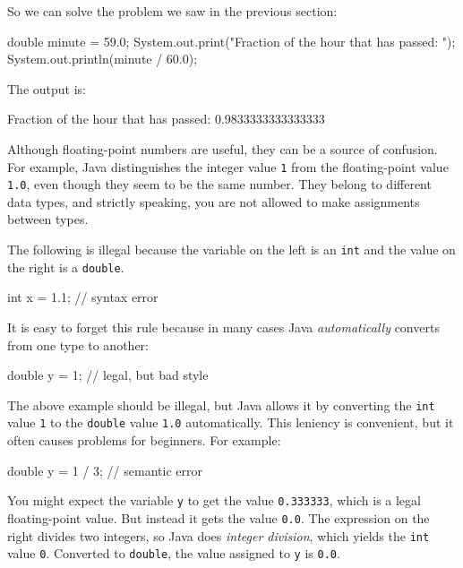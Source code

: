 \documentclass[12pt]{book}
\theoremstyle{exercise}
\newcommand{\java}[1]{\verb"#1"}
\newcommand{\java}[1]{\lstinline{#1}} %
\begin{document}
So we can solve the problem we saw in the previous section:

\begin{code}
    double minute = 59.0;
    System.out.print("Fraction of the hour that has passed: ");
    System.out.println(minute / 60.0);
\end{code}

The output is:

\begin{stdout}
Fraction of the hour that has passed: 0.9833333333333333
\end{stdout}

Although floating-point numbers are useful, they can be a source of confusion.
For example, Java distinguishes the integer value \java{1} from the floating-point value \java{1.0}, even though they seem to be the same number.
They belong to different data types, and strictly speaking, you are not allowed to make assignments between types.

The following is illegal because the variable on the left is an \java{int} and the value on the right is a \java{double}.

\begin{code}
    int x = 1.1;  // syntax error
\end{code}

It is easy to forget this rule because in many cases Java {\em automatically} converts from one type to another:

\begin{code}
    double y = 1;  // legal, but bad style
\end{code}

The above example should be illegal, but Java allows it by converting the \java{int} value \java{1} to the \java{double} value \java{1.0} automatically.
This leniency is convenient, but it often causes problems for beginners.
For example:

\begin{code}
    double y = 1 / 3;  // semantic error
\end{code}


You might expect the variable \java{y} to get the value \java{0.333333}, which is a legal floating-point value.
But instead it gets the value \java{0.0}.
The expression on the right divides two integers, so Java does {\em integer division}, which yields the \java{int} value \java{0}.
Converted to \java{double}, the value assigned to \java{y} is \java{0.0}.
\end{document}
